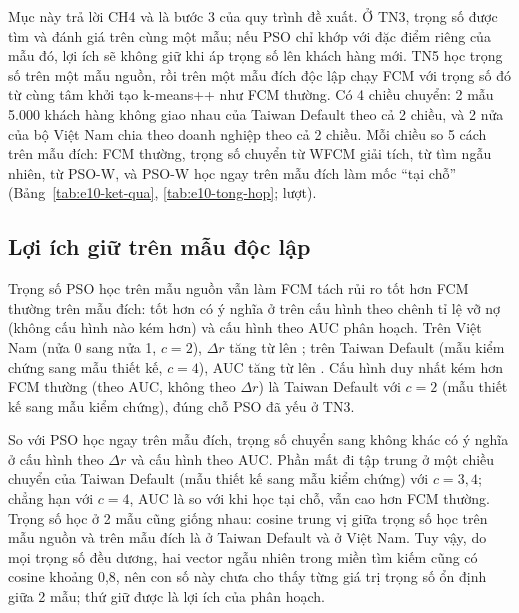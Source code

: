 Mục này trả lời CH4 và là bước 3 của quy trình đề xuất. Ở TN3, trọng số được tìm và đánh giá trên cùng một mẫu; nếu PSO chỉ
khớp với đặc điểm riêng của mẫu đó, lợi ích sẽ không giữ khi áp trọng số lên khách hàng mới. TN5 học trọng số trên một mẫu
nguồn, rồi trên một mẫu đích độc lập chạy FCM với trọng số đó từ cùng tâm khởi tạo k-means++ như FCM thường. Có 4 chiều
chuyển: 2 mẫu 5.000 khách hàng không giao nhau của Taiwan Default theo cả 2 chiều, và 2 nửa của bộ Việt Nam chia theo
doanh nghiệp theo cả 2 chiều. Mỗi chiều so 5 cách trên mẫu đích: FCM thường, trọng số chuyển từ WFCM giải tích, từ tìm
ngẫu nhiên, từ PSO-W, và PSO-W học ngay trên mẫu đích làm mốc ``tại chỗ'' (Bảng~\ref{tab:e10-ket-qua},
\ref{tab:e10-tong-hop}; \soLieuEMuoiSoLuot{} lượt).





\subsection{Lợi ích giữ trên mẫu độc lập}

Trọng số PSO học trên mẫu nguồn vẫn làm FCM tách rủi ro tốt hơn FCM thường trên mẫu đích: tốt hơn có ý nghĩa ở
\soLieuEMuoiChenhTiLeFcmKppHon{} trên \soLieuEMuoiSoCauHinh{} cấu hình theo chênh tỉ lệ vỡ nợ (không cấu hình nào kém hơn) và
\soLieuEMuoiAucCungFcmKppHon{} cấu hình theo AUC phân hoạch. Trên Việt Nam (nửa 0 sang nửa 1, $c = 2$), $\Delta r$ tăng từ
\soLieuEMuoiVnKhongMotCHaiFcmKppChenhTiLe{} lên \soLieuEMuoiVnKhongMotCHaiPsoChuyenChenhTiLe; trên Taiwan Default (mẫu kiểm
chứng sang mẫu thiết kế, $c = 4$), AUC tăng từ \soLieuEMuoiTaiwanKcTkCBonFcmKppAucCung{} lên
\soLieuEMuoiTaiwanKcTkCBonPsoChuyenAucCung. Cấu hình duy nhất kém hơn FCM thường (theo AUC, không theo $\Delta r$) là Taiwan
Default với $c = 2$ (mẫu thiết kế sang mẫu kiểm chứng), đúng chỗ PSO đã yếu ở TN3.

So với PSO học ngay trên mẫu đích, trọng số chuyển sang không khác có ý nghĩa ở \soLieuEMuoiChenhTiLePsoTaiChoBang{} cấu hình
theo $\Delta r$ và \soLieuEMuoiAucCungPsoTaiChoBang{} cấu hình theo AUC. Phần mất đi tập trung ở một chiều chuyển của Taiwan
Default (mẫu thiết kế sang mẫu kiểm chứng) với $c = 3, 4$; chẳng hạn với $c = 4$, AUC là
\soLieuEMuoiTaiwanTkKcCBonPsoChuyenAucCung{} so với \soLieuEMuoiTaiwanTkKcCBonPsoTaiChoAucCung{} khi học tại chỗ, vẫn cao hơn FCM
thường. Trọng số học ở 2 mẫu cũng giống nhau: cosine trung vị giữa trọng số học trên mẫu nguồn và trên mẫu đích là
\soLieuEMuoiTaiwanTkKcCosTrongSo{} ở Taiwan Default và \soLieuEMuoiVnKhongMotCosTrongSo{} ở Việt Nam. Tuy vậy, do mọi trọng số đều dương,
hai vector ngẫu nhiên trong miền tìm kiếm cũng có cosine khoảng 0,8, nên con số này chưa cho thấy từng giá trị trọng số ổn
định giữa 2 mẫu; thứ giữ được là lợi ích của phân hoạch.

